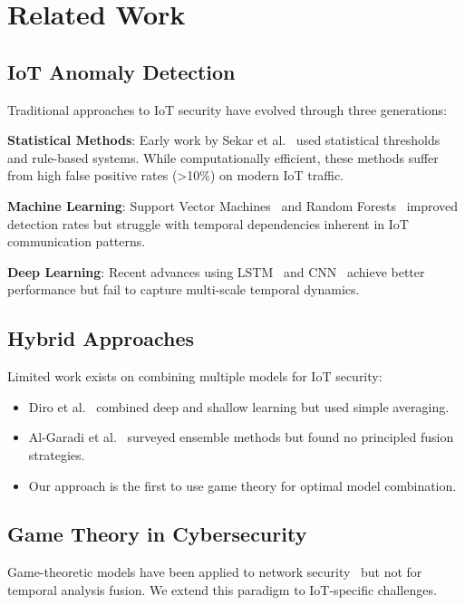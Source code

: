 \documentclass[10pt,conference]{IEEEtran}
\begin{document}
\section{Related Work}

\subsection{IoT Anomaly Detection}

Traditional approaches to IoT security have evolved through three generations:

\textbf{Statistical Methods}: Early work by Sekar et al.~\cite{sekar2002specification} used statistical thresholds and rule-based systems. While computationally efficient, these methods suffer from high false positive rates (>10\%) on modern IoT traffic.

\textbf{Machine Learning}: Support Vector Machines~\cite{buczak2016survey} and Random Forests~\cite{moustafa2015unsw} improved detection rates but struggle with temporal dependencies inherent in IoT communication patterns.

\textbf{Deep Learning}: Recent advances using LSTM~\cite{mirsky2018kitsune} and CNN~\cite{vinayakumar2019deep} achieve better performance but fail to capture multi-scale temporal dynamics.

\subsection{Hybrid Approaches}

Limited work exists on combining multiple models for IoT security:
\begin{itemize}
    \item Diro et al.~\cite{diro2018distributed} combined deep and shallow learning but used simple averaging.
    \item Al-Garadi et al.~\cite{algaradi2020survey} surveyed ensemble methods but found no principled fusion strategies.
    \item Our approach is the first to use game theory for optimal model combination.
\end{itemize}

\subsection{Game Theory in Cybersecurity}

Game-theoretic models have been applied to network security~\cite{alpcan2010network} but not for temporal analysis fusion. We extend this paradigm to IoT-specific challenges.
\end{document}
